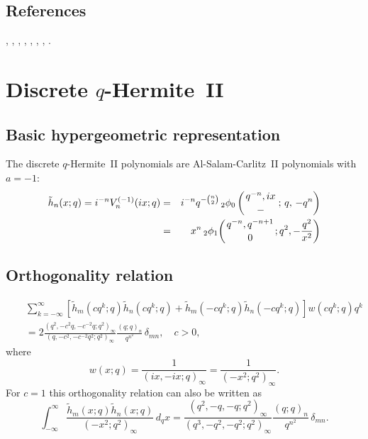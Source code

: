 \documentclass[envcountchap,graybox]{svmono}
\newcommand{\qhyp}[5]{\mbox{}_{#1}{\phi}_{#2}
\left(\genfrac{}{}{0pt}{}{#3}{#4}\,;\,q,\,#5\right)}
\newcommand{\qhypK}[5]{\,\mbox{}_{#1}\phi_{#2}\!\left(
  \genfrac{}{}{0pt}{}{#3}{#4};#5\right)}
\newcommand{\qhyp}[5]{\,\mbox{}_{#1}\phi_{#2}\!\left(
  \genfrac{}{}{0pt}{}{#3}{#4};#5\right)}
\begin{document}
{{\subsection*{References}
\cite{AlSalam90}, \cite{AlSalamCarlitz}, \cite{AtakRahmanSuslov},
\cite{BergIsmail}, \cite{BustozIsmail82}, \cite{GasperRahman90}, \cite{Hahn},
\cite{Koorn97}.


\newpage

\section{Discrete $q$-Hermite~II}
\par\setcounter{equation}{0}

\subsection*{Basic hypergeometric representation}
The discrete $q$-Hermite~II polynomials are Al-Salam-Carlitz~II polynomials
with $a=-1$:
\begin{eqnarray}
\label{DefDiscreteqHermiteII}
{\tilde h}_n(x;q)=i^{-n}V_n^{(-1)}(ix;q)
&=&i^{-n}q^{-\binom{n}{2}}\,\qhyp{2}{0}{q^{-n},ix}{-}{-q^n}\\
&=&x^n
\qhypK{2}{1}{q^{-n},q^{-n+1}}{0}{q^2,-\frac{q^2}{x^2}}\nonumber
\end{eqnarray}

\subsection*{Orthogonality relation}
\begin{eqnarray}
\label{OrtDiscreteqHermiteIIa}
& &\sum_{k=-\infty}^{\infty}\left[{\tilde h}_m(cq^k;q)
{\tilde h}_n(cq^k;q)+{\tilde h}_m(-cq^k;q){\tilde h}_n(-cq^k;q)\right]
w(cq^k;q)q^k\nonumber\\
& &{}=2\frac{(q^2,-c^2q,-c^{-2}q;q^2)_{\infty}}{(q,-c^2,-c^{-2}q^2;q^2)_{\infty}}
\frac{(q;q)_n}{q^{n^2}}\,\delta_{mn},\quad c>0,
\end{eqnarray}
where
$$w(x;q)=\frac{1}{(ix,-ix;q)_{\infty}}=\frac{1}{(-x^2;q^2)_{\infty}}.$$
For $c=1$ this orthogonality relation can also be written as
\begin{equation}
\label{OrtDiscreteqHermiteIIb}
\int_{-\infty}^{\infty}\frac{{\tilde h}_m(x;q){\tilde h}_n(x;q)}{(-x^2;q^2)_{\infty}}\,d_qx
=\frac{\left(q^2,-q,-q;q^2\right)_{\infty}}{\left(q^3,-q^2,-q^2;q^2\right)_{\infty}}
\frac{(q;q)_n}{q^{n^2}}\,\delta_{mn}.
\end{equation}

}}
\end{document}
